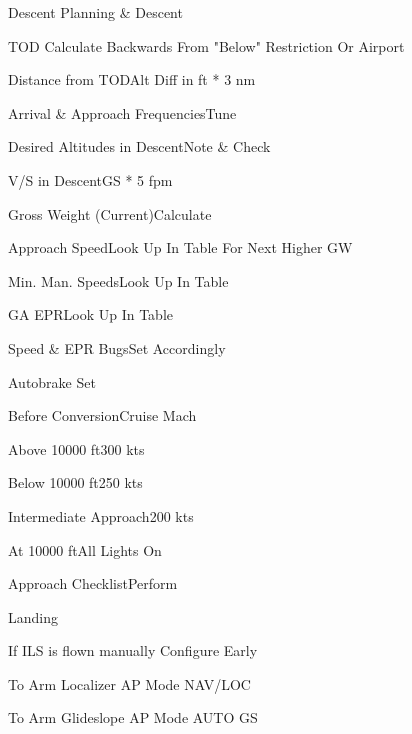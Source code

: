 \documentclass[sim-use]{checklist}
\begin{document}
\begin{checklist}{Descent Planning \& Descent}
        \item {TOD} {Calculate Backwards From "Below" Restriction Or Airport}
        \item{Distance from TOD}{Alt Diff in ft * 3 nm}
        \item{Arrival \& Approach Frequencies}{Tune}
        \item{Desired Altitudes in Descent}{Note \& Check}
        \item{V/S in Descent}{GS * 5 fpm}
         {
            \item{Gross Weight (Current)}{Calculate}
            \item{Approach Speed}{Look Up In Table For Next Higher GW}
            \item{Min. Man. Speeds}{Look Up In Table}
            \item{GA EPR}{Look Up In Table}
            \item{Speed \& EPR Bugs}{Set Accordingly}
            \item{Autobrake} {Set}
        }
         {
            \item{Before Conversion}{Cruise Mach}
            \item{Above 10000 ft}{300 kts}
            \item{Below 10000 ft}{250 kts}
            \item{Intermediate Approach}{200 kts}
        }
        \item{At 10000 ft}{All Lights On}
         {
            \item{Approach Checklist}{Perform}
        }
\end{checklist}

\begin{checklist} {Landing}
    \item{If ILS is flown manually} {Configure Early}
    \item{To Arm Localizer} {AP Mode NAV/LOC}
    \item{To Arm Glideslope} {AP Mode AUTO GS}
\end{checklist}
\end{document}
